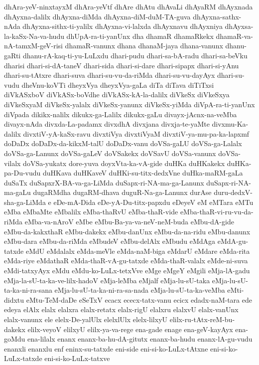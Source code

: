 {dhAra-yeV-ninxtayxM
dhAra-yeVtf
dhAre
dhAtu
dhAvaLi
dhAyaRM
dhAyxnada
dhAyxna-dalilx
dhAyxna-diMda
dhAyxna-diM-duM-TA-guva
dhAyxna-sathx-nAda
dhAyxna-sithx-ti-yalilx
dhAyxna-vi-lalxda
dhAyxnavu
dhAyxniya
dhAyxsa-la-kaSx-Na-va-hudu
dhUpA-ra-ti-yanUnx
dha
dhamaR
dhamaRkekx
dhamaR-va-nA-tamxM-geV-risi
dhamaR-vanunx
dhana
dhanaM-jaya
dhana-vanunx
dhanu-gaRti
dhanu-rA-kaq-ti-yu-LuLxdu
dhari-pudu
dhari-sa-bA-radu
dhari-sa-beVku
dharisi
dhari-si-dA-taneV
dhari-sida
dhari-si-dare
dhari-sipapx
dhari-si-yAnu
dhari-su-tAtxre
dhari-suva
dhari-su-vu-da-riMda
dhari-su-vu-dayAyx
dhari-su-vudu
dheVnu-koVTi
dheyxVya
dheyxVya-gaLa
diTa
diTava
diTiTxsi
diVkASxboV
diVkASx-boVdhe
diVkASx-kA-la-dalilx
diVkeSx
diVkeSxya
diVkeSxyaM
diVkeSx-yalalx
diVkeSx-yanunx
diVkeSx-yiMda
diVpA-ra-ti-yanUnx
diVpada
dikikx-nalilx
dikukx-ga-Lalilx
dikukx-gaLu
divayx-jAcnx-na-veMba
divayx-nAda
divxda-La-padamx
divxdhA
divxjana
divxja-te-yaMte
divxmu-Ka-dalilx
divxtiV-yA-kaSx-ravu
divxtiVya
divxtiVyaM
divxtiV-ya-mu-pa-ka-lapxmf
doDaDx
doDaDx-da-kikxM-talU
doDaDx-vanu
doVSa-gaLU
doVSa-ga-Lalalx
doVSa-ga-Lanunx
doVSa-gaLeV
doVSakekx
doVSavU
doVSa-vanunx
doVSa-vilalx
doVSa-yukatx
dore-yuva
doyxVta-ka-vA-gide
duHKa
duHKakekx
duHKa-pa-Du-vudu
duHKava
duHKaveV
duHKi-su-titx-dedxVne
duHka-maRM-gaLa
duSaTx
duSapxrX-BA-va-ga-LiMda
duSapx-ri-NA-ma-ga-Lanunx
duSapx-ri-NA-ma-gaLu
dugaRMdha
dugaRM-dhava
duguR-Na-ga-Lanunx
durAse
duru-dedxV-sha-ga-LiMda
e
eDe-mA-Dida
eDe-yA-Du-titx-papxdu
eDeyeV
eM
eMTara
eMTu
eMba
eMbaMte
eMbalilx
eMba-thaRvU
eMba-thaR-vide
eMba-thaR-vi-ru-vu-da-riMda
eMba-va-nAroV
eMbe
eMbu-Ba-ya-va-neV-neM-buda
eMbu-dA-gide
eMbu-da-kakxthaR
eMbu-dakekx
eMbu-danUnx
eMbu-da-na-ridu
eMbu-danunx
eMbu-dara
eMbu-da-riMda
eMbudeV
eMbu-delAlx
eMbudu
eMdAga
eMdA-gu-tatxde
eMdU
eMdalalx
eMda-meVle
eMda-naM-biga
eMdarU
eMdare
eMda-rita
eMda-riye
eMdathaR
eMda-thaR-vA-gu-tatxde
eMda-thaR-valalx
eMde-ni-suva
eMdi-tatxyAyx
eMdu
eMdu-ko-LuLx-tetxVve
eMge
eMgeY
eMgili
eMja-lA-gadu
eMja-la-sU-ta-ka-ve-lilx-hadoV
eMja-leMba
eMjalf
eMja-lu-sU-taka
eMja-lu-sU-ta-ka-ni-ra-sana
eMja-lu-sU-ta-ka-ni-ra-sa-nada
eMja-lu-sU-ta-ka-veMba
eMti-didxtu
eMtu-TeM-daDe
eSeTxV
ecacx
ececx-tatx-vanu
ecicx
edadx-naM-tara
ede
edeya
elAlx
elalx
elalxra
elalx-retatx
elalx-rigU
elalxru
elalxvU
elalx-vanUnx
elalx-vanunx
ele
elelx-De-yalUlx
elelxlUlx
elelx-lilxyU
elilx-ru-tAtx-reM-bu-dakekx
elilx-veyoV
elilxyU
elilx-ya-va-rege
ena-gade
enage
ena-geV-kayAyx
ena-goMdu
ena-lilalx
enanx
enanx-ba-hu-dA-gitutx
enanx-ba-hudu
enanx-lA-gu-vudu
enanxli
enanxlu
enf
eninx-su-tatxde
eni-side
eni-si-ko-LuLx-tAtxne
eni-si-ko-LuLx-tatxde
eni-si-ko-LuLx-tatxve
}
